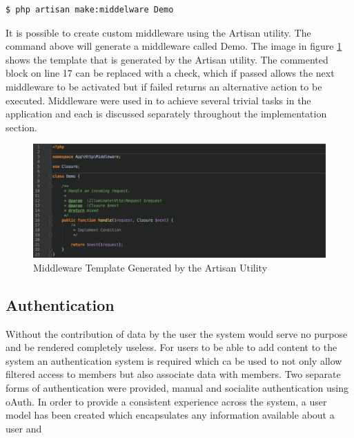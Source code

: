 \begin{lstlisting}[language=bash]
	$ php artisan make:middelware Demo
\end{lstlisting}

 It is possible to create custom middleware using the Artisan utility. The command above will generate a middleware called Demo. The image in figure \ref{fig:Middleware_Template} shows the template that is generated by the Artisan utility. The commented block on line 17 can be replaced with a check, which if passed allows the next middleware to be activated but if failed returns an alternative action to be executed. Middleware were used in to achieve several trivial tasks in the application and each is discussed separately throughout the implementation section.


\begin{figure}[H]
	\centering
	\includegraphics[width=1.0\textwidth]{images/Code/Middleware_Template}
	\caption{Middleware Template Generated by the Artisan Utility} \label{fig:Middleware_Template}
\end{figure}

\subsection{Authentication}
Without the contribution of data by the user the system would serve no purpose and be rendered completely useless. For users to be able to add content to the system an authentication system is required which ca be used to not only allow filtered access to members but also associate data with members. Two separate forms of authentication were provided, manual and socialite authentication using oAuth. In order to provide a consistent experience across the system, a user model has been created which encapsulates any information available about  a user and 

